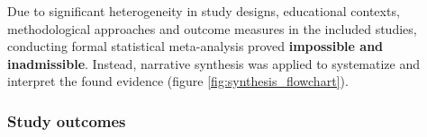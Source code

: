 \documentclass[
hf,
]{ceurart}
\begin{document}
Due to significant heterogeneity in study designs, educational contexts, methodological approaches and outcome measures in the included studies, conducting formal statistical meta-analysis proved \textbf{impossible and inadmissible}. Instead, narrative synthesis was applied to systematize and interpret the found evidence (figure \ref{fig:synthesis_flowchart}).


\subsubsection{Study outcomes}
\end{document}
